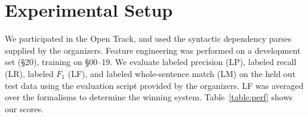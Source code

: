 \documentclass[11pt]{article}
\begin{document}




\section{Experimental Setup}
\label{s:evaluation}

We participated in the Open Track, and used the syntactic dependency parses supplied by the organizers.  Feature engineering was performed on a development set (\S 20), training on \S 00--19.
We evaluate labeled precision (LP), labeled recall (LR), labeled $F_1$ (LF), and
labeled whole-sentence match (LM) on the held out test data using the
evaluation script provided by the organizers. 
LF was averaged over the formalisms to determine the winning system.
Table~\ref{table:perf} shows our scores.

% 
% 
% 
% 

% 
% 
\end{document}
